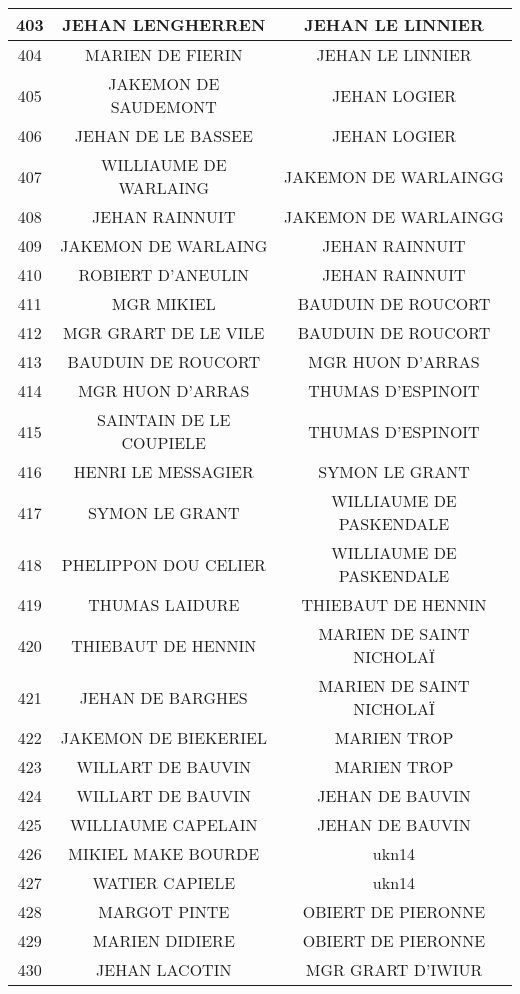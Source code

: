 \begin{center}
\begin{longtable}{|c|c|c|}
\hline	403	&	JEHAN LENGHERREN	&	JEHAN LE LINNIER	\\
\hline	404	&	MARIEN DE FIERIN	&	JEHAN LE LINNIER	\\
\hline	405	&	JAKEMON DE SAUDEMONT	&	JEHAN LOGIER	\\
\hline	406	&	JEHAN DE LE BASSEE	&	JEHAN LOGIER	\\
\hline	407	&	WILLIAUME DE WARLAING	&	JAKEMON DE WARLAINGG	\\
\hline	408	&	JEHAN RAINNUIT	&	JAKEMON DE WARLAINGG	\\
\hline	409	&	JAKEMON DE WARLAING	&	JEHAN RAINNUIT	\\
\hline	410	&	ROBIERT D'ANEULIN	&	JEHAN RAINNUIT	\\
\hline	411	&	MGR MIKIEL	&	BAUDUIN DE ROUCORT	\\
\hline	412	&	MGR GRART DE LE VILE	&	BAUDUIN DE ROUCORT	\\
\hline	413	&	BAUDUIN DE ROUCORT	&	MGR HUON D'ARRAS	\\
\hline	414	&	MGR HUON D'ARRAS	&	THUMAS D'ESPINOIT	\\
\hline	415	&	SAINTAIN DE LE COUPIELE	&	THUMAS D'ESPINOIT	\\
\hline	416	&	HENRI LE MESSAGIER	&	SYMON LE GRANT	\\
\hline	417	&	SYMON LE GRANT	&	WILLIAUME DE PASKENDALE	\\
\hline	418	&	PHELIPPON DOU CELIER	&	WILLIAUME DE PASKENDALE	\\
\hline	419	&	THUMAS LAIDURE	&	THIEBAUT DE HENNIN	\\
\hline	420	&	THIEBAUT DE HENNIN	&	MARIEN DE SAINT NICHOLAÏ	\\
\hline	421	&	JEHAN DE BARGHES	&	MARIEN DE SAINT NICHOLAÏ	\\
\hline	422	&	JAKEMON DE BIEKERIEL	&	MARIEN TROP	\\
\hline	423	&	WILLART DE BAUVIN	&	MARIEN TROP	\\
\hline	424	&	WILLART DE BAUVIN	&	JEHAN DE BAUVIN	\\
\hline	425	&	WILLIAUME CAPELAIN	&	JEHAN DE BAUVIN	\\
\hline	426	&	MIKIEL MAKE BOURDE	&	ukn14	\\
\hline	427	&	WATIER CAPIELE	&	ukn14	\\
\hline	428	&	MARGOT PINTE	&	OBIERT DE PIERONNE	\\
\hline	429	&	MARIEN DIDIERE	&	OBIERT DE PIERONNE	\\
\hline	430	&	JEHAN LACOTIN	&	MGR GRART D'IWIUR	\\

\end{longtable}
\end{center}

